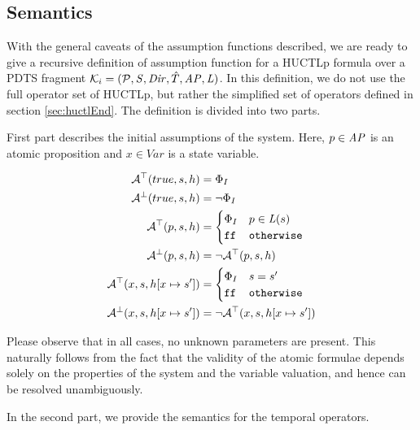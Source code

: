 \subsection{Semantics}

With the general caveats of the assumption functions described, we are ready to give a recursive definition of assumption function for a \ac{HUCTLp} formula over a \ac{PDTS} fragment $\mathcal{K}_i = (\mathcal{P}, \mathit{S}, \mathit{Dir}, \hat{T}, \mathit{AP}, \mathit{L})$. In this definition, we do not use the full operator set of \ac{HUCTLp}, but rather the simplified set of operators defined in section \ref{sec:huctlEnd}. The definition is divided into two parts.

First part describes the initial assumptions of the system. Here, $p \in \mathit{AP}$ is an atomic proposition and $x \in Var$ is a state variable.

\begin{align*}
	\mathcal{A}^\top(true, s, h) & = \Phi_I \\
	\mathcal{A}^\bot(true, s, h) & = \neg \Phi_I \\
	\mathcal{A}^\top(p, s, h) & = 
	\begin{cases}
		\Phi_I & p \in \mathit{L}(s) \\
		\texttt{ff} & \texttt{otherwise} \\
	\end{cases}
	\\
	\mathcal{A}^\bot(p, s, h) & = \neg \mathcal{A}^\top(p, s, h) \\
	\mathcal{A}^\top(x, s, h[ x \mapsto s' ]) & = 
	\begin{cases}
		\Phi_I & s = s' \\
		\texttt{ff} & \texttt{otherwise}
	\end{cases}
	\\
	\mathcal{A}^\bot(x, s, h[ x \mapsto s']) & = \neg \mathcal{A}^\top(x, s, h[ x \mapsto s' ]) \\
\end{align*}

Please observe that in all cases, no unknown parameters are present. This naturally follows from the fact that the validity of the atomic formulae depends solely on the properties of the system and the variable valuation, and hence can be resolved unambiguously.

In the second part, we provide the semantics for the temporal operators.

